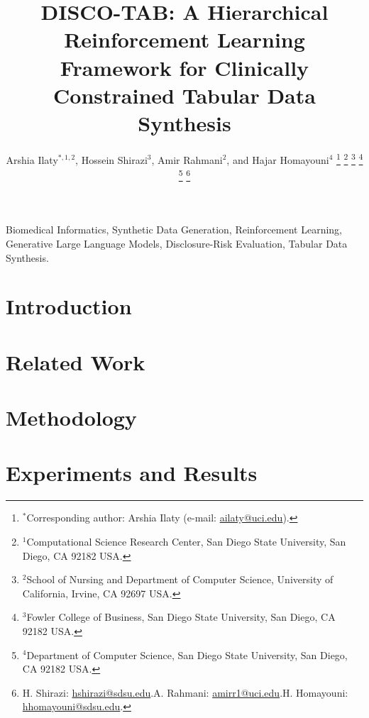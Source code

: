 \documentclass[journal,twoside,web]{ieeecolor}
\newcommand{\rev}[1]{{\color{blue}#1}}
\begin{document}
\title{DISCO-TAB: A Hierarchical Reinforcement Learning Framework for \rev{Clinically Constrained Tabular Data Synthesis}}

\author{Arshia Ilaty$^{*,1,2}$, Hossein Shirazi$^{3}$, Amir Rahmani$^{2}$, and Hajar Homayouni$^{4}$%
\thanks{$^{*}$Corresponding author: Arshia Ilaty (e-mail: \href{mailto:ailaty@uci.edu}{ailaty@uci.edu}).}%
\thanks{$^{1}$Computational Science Research Center, San Diego State University, San Diego, CA 92182 USA.}%
\thanks{$^{2}$School of Nursing and Department of Computer Science, University of California, Irvine, CA 92697 USA.}%
\thanks{$^{3}$Fowler College of Business, San Diego State University, San Diego, CA 92182 USA.}
\thanks{$^{4}$Department of Computer Science, San Diego State University, San Diego, CA 92182 USA.}%
\thanks{H. Shirazi: \href{mailto:hshirazi@sdsu.edu}{hshirazi@sdsu.edu}.\quad A. Rahmani: \href{mailto:amirr1@uci.edu}{amirr1@uci.edu}.\quad H. Homayouni: \href{mailto:hhomayouni@sdsu.edu}{hhomayouni@sdsu.edu}.}}

\maketitle

\begin{abstract}

\end{abstract}

\begin{IEEEkeywords}
Biomedical Informatics, Synthetic Data Generation, Reinforcement Learning, Generative Large Language Models, \rev{Disclosure-Risk Evaluation}, Tabular Data Synthesis.
\end{IEEEkeywords}

\section{Introduction}\label{sec:introduction}


\section{Related Work}\label{sec:related_work}


\section{Methodology}\label{sec:methodology}


\section{Experiments and Results}\label{sec:experiments}

\end{document}
